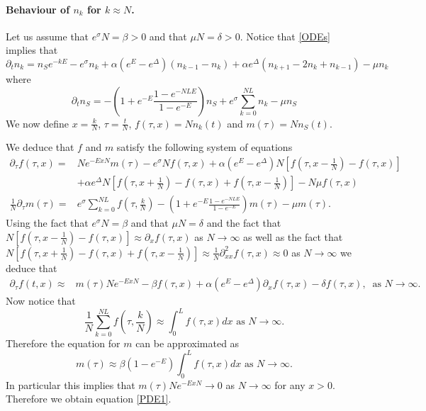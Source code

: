 \documentclass{article}
\numberwithin{equation}{section}
\theoremstyle{plain}
\begin{document}
\paragraph{Behaviour of $n_k$ for $k \approx N $.}
Let us assume that $e^\sigma N = \beta>0 $ and that $\mu N=\delta >0$.
Notice that \eqref{ODEs} implies that 
\[
\partial_t n_k = n_S e^{- k E } - e^\sigma n_k + \alpha (e^E- e^\Delta) (n_{k-1} - n_k ) + \alpha e^\Delta (n_{k+1 } - 2 n_k + n_{k-1} )- \mu n_k 
\]
where 
\[ 
\partial_t n_S = - \left( 1 + e^{- E } \frac{1- e^{- N L E }}{1- e^{- E }} \right)  n_S + e^{\sigma }  \sum_{k=0}^{N L} n_k - \mu n_S 
\]
We now define $x= \frac{k}{N }$, $\tau = \frac{t }{ N } $, $f(\tau, x)= N n_k(t)$ and $m(\tau )= N n_S (t) $. 

We deduce that $f$ and $m $ satisfy the following system of equations 
\begin{align*}
\partial_\tau f (\tau ,x) =& N e^{- E x N } m (\tau )  - e^\sigma N f(\tau, x) + \alpha (e^E - e^\Delta ) N \left[ f\left(\tau, x- \frac{1}{N } \right)  - f(\tau, x) \right] \\
& + \alpha e^\Delta N \left[ f\left(\tau, x+\frac{1}{N } \right) - f(\tau, x) + f\left(\tau, x-\frac{1}{N } \right)  \right] - N \mu f(\tau,x) \\
\frac{1}{N} \partial_\tau m(\tau) =& e^\sigma \sum_{k=0}^{NL} f \left(\tau, \frac{k}{N} \right) -  \left( 1 + e^{- E } \frac{1- e^{- N L E }}{1- e^{- E }} \right)  m(\tau ) - \mu m(\tau). 
\end{align*}
Using the fact that $e^\sigma N = \beta $ and that $\mu N=\delta $ and the fact that $ N \left[ f\left(\tau, x- \frac{1}{N } \right)  - f(\tau, x) \right] \approx \partial_x  f(\tau,x) $ as $N \to \infty $ as well as the fact that 
$N \left[ f\left(\tau ,x+\frac{1}{N } \right) - f(\tau, x) + f\left(\tau, x-\frac{1}{N } \right)  \right] \approx \frac{1}{N} \partial^2_{xx}  f(\tau,x) \approx 0$ as $N \to \infty $ we deduce that 
\begin{align*}
\partial_\tau f (t,x) \approx & m(\tau) N e^{- E x N } - \beta f(\tau,x)  + \alpha (e^E - e^\Delta ) \partial_x  f(\tau,x) - \delta f(\tau,x), \ \text{ as } N \to \infty.
\end{align*}
Now notice that
\[
\frac{1}{N} \sum_{k=0}^{NL} f \left(\tau, \frac{k}{N} \right) \approx \int_0^L f(\tau,x) dx \text{ as } N \to \infty. 
\]
Therefore the equation for $m $ can be approximated as 
\[
 m(\tau) \approx \beta ( 1- e^{- E })  \int_0^L f(\tau, x ) dx   \text{ as } N \to \infty.
\] 
In particular this implies that $ m(\tau) N e^{ - Ex N } \rightarrow 0 $ as $N \to \infty$ for any $x>0$.
Therefore we obtain equation \eqref{PDE1}.
 
\end{document}
